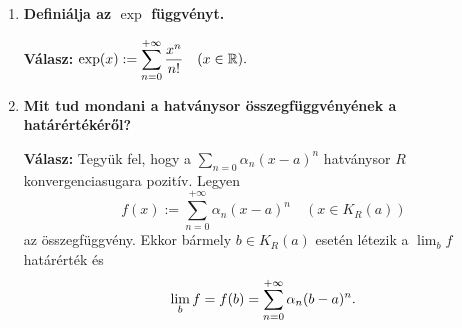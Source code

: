 \documentclass[a4paper,11.5pt]{article}
\begin{document}
\begin{enumerate}
		\item \textbf{Definiálja az $\exp$ függvényt.}
		
		\textbf{Válasz:} $\displaystyle \exp(x):=\displaystyle\sum_{n=0}^{+\infty}\frac{x^n}{n!}\quad (x\in\mathbb{R}).$
		
		\item \textbf{Mit tud mondani a hatványsor összegfüggvényének a határértékéről?}
		
		\textbf{Válasz:} Tegyük fel, hogy a $\sum_{n=0}\alpha_n(x-a)^n$ hatványsor $R$ konvergenciasugara pozitív. Legyen
		\[f(x):=\sum_{n=0}^{+\infty}\alpha_n(x-a)^n\quad (x\in K_R(a))\]
		az összegfüggvény. Ekkor bármely $b\in K_R(a)$ esetén létezik a $\lim_bf$ határérték és
		\[ \lim_bf=f(b)=\displaystyle\sum_{n=0}^{+\infty}\alpha_n(b-a)^n. \]
	\end{enumerate}
\end{document}
